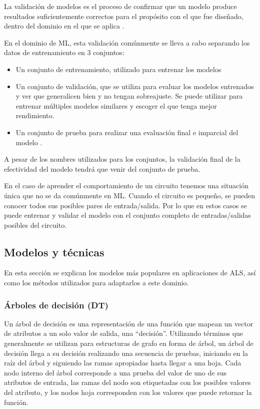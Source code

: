 La validación de modelos es el proceso de confirmar que un modelo produce
resultados suficientemente correctos para el propósito con el que fue diseñado,
dentro del dominio en el que se aplica \cite{schlesinger_terminology_1979}.

En el dominio de ML, esta validación comúnmente se lleva a cabo separando los
datos de entrenamiento en 3 conjuntos:

\begin{itemize}
  \item Un conjunto de entrenamiento, utilizado para entrenar los modelos
  \item Un conjunto de validación, que se utiliza para evaluar los modelos
    entrenados y ver que generalicen bien y no tengan sobreajuste. Se puede
    utilizar para entrenar múltiples modelos similares y escoger el que tenga
    mejor rendimiento.
  \item Un conjunto de prueba para realizar una evaluación final e imparcial
    del modelo \cite{russell2016artificial}.
\end{itemize}

A pesar de los nombres utilizados para los conjuntos, la validación final de la
efectividad del modelo tendrá que venir del conjunto de prueba.

En el caso de aprender el comportamiento de un circuito tenemos una situación
única que no se da comúnmente en ML. Cuando el circuito es pequeño, se pueden
conocer todos sus posibles pares de entrada/salida. Por lo que en estos casos
se puede entrenar y validar el modelo con el conjunto completo de
entradas/salidas posibles del circuito.

\subsection{Modelos y técnicas}

En esta sección se explican los modelos más populares en aplicaciones de ALS,
así como los métodos utilizados para adaptarlos a este dominio.

\subsubsection{Árboles de decisión (DT)}

Un árbol de decisión es una representación de una función que mapean un vector
de atributos a un solo valor de salida, una ``decisión''. Utilizando términos
que generalmente se utilizan para estructuras de grafo en forma de árbol, un
árbol de decisión llega a su decisión realizando una secuencia de pruebas,
iniciando en la raíz del árbol y siguiendo las ramas apropiadas hasta llegar a
una hoja. Cada nodo interno del árbol corresponde a una prueba del valor de uno
de sus atributos de entrada, las ramas del nodo son etiquetadas con los
posibles valores del atributo, y los nodos hoja corresponden con los valores
que puede retornar la función.

